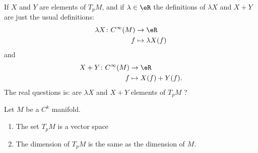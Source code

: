 If \( X\) and \( Y \) are elements of \( T_pM\), and if \( \lambda\in \eR\) the definitions of \( \lambda X\) and \( X+Y\) are just the usual definitions:
\begin{equation}
	\begin{aligned}
		\lambda X\colon  C^{\infty}(M) & \to \eR              \\
		f                              & \mapsto \lambda X(f)
	\end{aligned}
\end{equation}
and
\begin{equation}
	\begin{aligned}
		X+Y\colon  C^{\infty}(M) & \to \eR            \\
		f                        & \mapsto X(f)+Y(f).
	\end{aligned}
\end{equation}
The real questions is: are \( \lambda X\) and \( X+Y\) elements of \( T_pM\) ?

\begin{proposition}  \label{PROPooEJBWooSbvypo}
	Let \( M\) be a \( C^k\) manifold.
	\begin{enumerate}
		\item
		      The set \( T_pM\) is  a vector space
		\item
		      The dimension of \( T_pM\) is the same as the dimension of \( M\).
	\end{enumerate}
\end{proposition}

